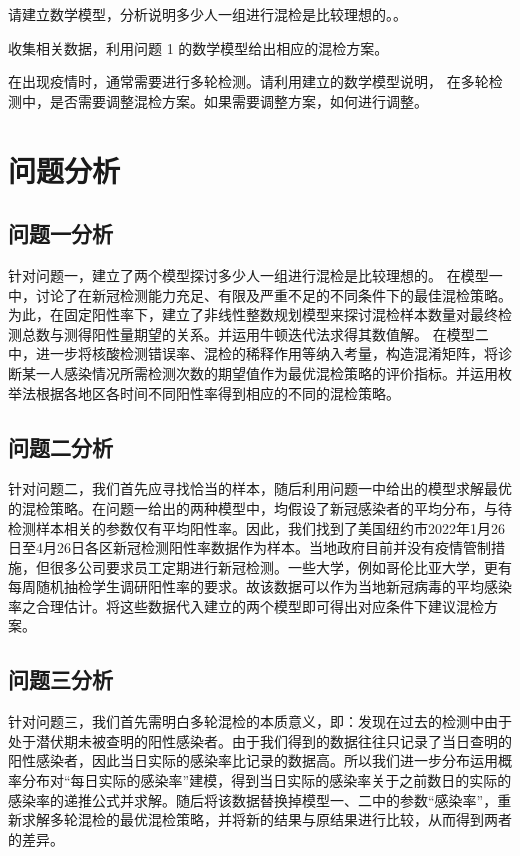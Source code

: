 \documentclass[withoutpreface,bwprint]{cumcmthesis} %
\begin{document}
 \begin{problem}
请建立数学模型，分析说明多少人一组进行混检是比较理想的。。
 \end{problem}
 \begin{problem}
收集相关数据，利用问题 1 的数学模型给出相应的混检方案。
 \end{problem}
 \begin{problem}
在出现疫情时，通常需要进行多轮检测。请利用建立的数学模型说明，
在多轮检测中，是否需要调整混检方案。如果需要调整方案，如何进行调整。
\end{problem}

\section{问题分析}
\subsection{问题一分析}
针对问题一，建立了两个模型探讨多少人一组进行混检是比较理想的。
在模型一中，讨论了在新冠检测能力充足、有限及严重不足的不同条件下的最佳混检策略。为此，在固定阳性率下，建立了非线性整数规划模型来探讨混检样本数量对最终检测总数与测得阳性量期望的关系。并运用牛顿迭代法求得其数值解。
在模型二中，进一步将核酸检测错误率、混检的稀释作用等纳入考量，构造混淆矩阵，将诊断某一人感染情况所需检测次数的期望值作为最优混检策略的评价指标。并运用枚举法根据各地区各时间不同阳性率得到相应的不同的混检策略。

\subsection{问题二分析}
针对问题二，我们首先应寻找恰当的样本，随后利用问题一中给出的模型求解最优的混检策略。在问题一给出的两种模型中，均假设了新冠感染者的平均分布，与待检测样本相关的参数仅有平均阳性率。因此，我们找到了美国纽约市2022年1月26日至4月26日各区新冠检测阳性率数据作为样本。当地政府目前并没有疫情管制措施，但很多公司要求员工定期进行新冠检测。一些大学，例如哥伦比亚大学，更有每周随机抽检学生调研阳性率的要求\cite{columbia}。故该数据可以作为当地新冠病毒的平均感染率之合理估计。将这些数据代入建立的两个模型即可得出对应条件下建议混检方案。

\subsection{问题三分析}
针对问题三，我们首先需明白多轮混检的本质意义，即：发现在过去的检测中由于处于潜伏期未被查明的阳性感染者。由于我们得到的数据往往只记录了当日查明的阳性感染者，因此当日实际的感染率比记录的数据高。所以我们进一步分布运用概率分布对“每日实际的感染率”建模，得到当日实际的感染率关于之前数日的实际的感染率的递推公式并求解。随后将该数据替换掉模型一、二中的参数“感染率”，重新求解多轮混检的最优混检策略，并将新的结果与原结果进行比较，从而得到两者的差异。
\end{document}
